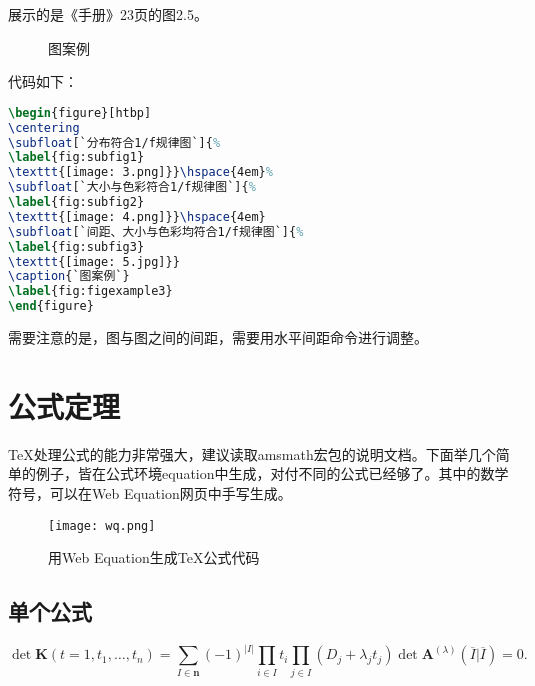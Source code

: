展示的是《手册》23页的图2.5。

\begin{figure}[htbp]
\centering
{}\hspace{4em}%
\hspace{4em}
\caption{图案例}
\label{fig:figexample3}
\end{figure}

代码如下：

\begin{lstlisting}[language=TeX]
\begin{figure}[htbp]
\centering
\subfloat[`分布符合1/f规律图`]{%
\label{fig:subfig1}
\texttt{[image: 3.png]}}\hspace{4em}%
\subfloat[`大小与色彩符合1/f规律图`]{%
\label{fig:subfig2}
\texttt{[image: 4.png]}}\hspace{4em}
\subfloat[`间距、大小与色彩均符合1/f规律图`]{%
\label{fig:subfig3}
\texttt{[image: 5.jpg]}}
\caption{`图案例`}
\label{fig:figexample3}
\end{figure}
\end{lstlisting}

需要注意的是，图与图之间的间距，需要用水平间距命令进行调整。

\section{公式定理}
\TeX{}处理公式的能力非常强大，建议读取amsmath宏包的说明文档。下面举几个简单的例子，皆在公式环境equation中生成，对付不同的公式已经够了。其中的数学符号，可以在Web Equation网页中手写生成。

\begin{figure}[htbp]
\begin{center}
\texttt{[image: wq.png]}
\end{center}
\caption{用Web Equation生成\TeX{}公式代码}
\end{figure}

\subsection{单个公式}

\newcommand{\envert}[1]{\left\lvert#1\right\rvert} 
\begin{equation}\label{detK2}
\det\mathbf{K}(t=1,t_1,\dots,t_n)=\sum_{I\in\mathbf{n}}(-1)^{\envert{I}}
\prod_{i\in I}t_i\prod_{j\in I}(D_j+\lambda_jt_j)\det\mathbf{A}
^{(\lambda)}(\overline{I}|\overline{I})=0.
\end{equation} 

